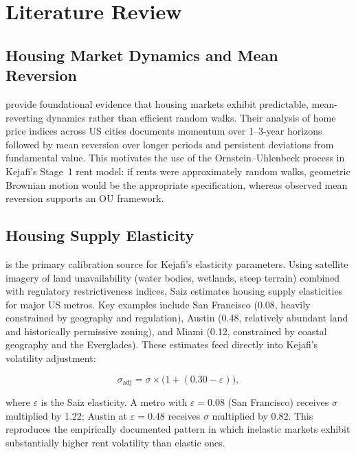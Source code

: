 \documentclass[11pt,letterpaper]{article}
\begin{document}
\section{Literature Review}
\label{sec:litreview}

\subsection{Housing Market Dynamics and Mean Reversion}

\citet{case1989} provide foundational evidence that housing markets exhibit predictable,
mean-reverting dynamics rather than efficient random walks. Their analysis of home price
indices across US cities documents momentum over 1--3-year horizons followed by mean
reversion over longer periods and persistent deviations from fundamental value. This
motivates the use of the Ornstein--Uhlenbeck process in Kejafi's Stage~1 rent model: if
rents were approximately random walks, geometric Brownian motion would be the appropriate
specification, whereas observed mean reversion supports an OU framework.

\subsection{Housing Supply Elasticity}

\citet{saiz2010} is the primary calibration source for Kejafi's elasticity parameters.
Using satellite imagery of land unavailability (water bodies, wetlands, steep terrain)
combined with regulatory restrictiveness indices, Saiz estimates housing supply
elasticities for major US metros. Key examples include San Francisco (0.08, heavily
constrained by geography and regulation), Austin (0.48, relatively abundant land and
historically permissive zoning), and Miami (0.12, constrained by coastal geography and the
Everglades). These estimates feed directly into Kejafi's volatility adjustment:
\begin{eqbox}
\begin{equation}
\sigma_{\text{adj}} = \sigma \times \bigl(1 + (0.30 - \varepsilon)\bigr),
\label{eq:sigma_adj}
\end{equation}
\end{eqbox}
where $\varepsilon$ is the Saiz elasticity. A metro with $\varepsilon = 0.08$ (San
Francisco) receives $\sigma$ multiplied by 1.22; Austin at $\varepsilon = 0.48$
receives $\sigma$ multiplied by 0.82. This reproduces the empirically documented pattern
in which inelastic markets exhibit substantially higher rent volatility than elastic ones.
\end{document}
